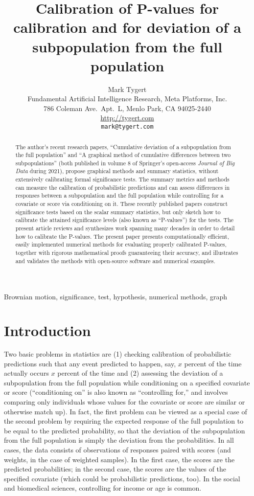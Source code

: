 \documentclass[12pt]{article}
\title{Calibration of P-values for calibration and for deviation
       of a subpopulation from the full population}
\author{Mark Tygert\\
        Fundamental Artificial Intelligence Research, Meta Platforms, Inc.\\
        786 Coleman Ave.\ Apt.\ L, Menlo Park, CA 94025-2440\\
        \url{http://tygert.com}\\
        {\tt mark@tygert.com}}
\begin{document}
\maketitle

\begin{abstract}
The author's recent research papers,
``Cumulative deviation of a subpopulation from the full population'' and
``A graphical method of cumulative differences between two subpopulations''
(both published in volume 8 of Springer's open-access {\it Journal of Big Data}
during 2021), propose graphical methods and summary statistics,
without extensively calibrating formal significance tests.
The summary metrics and methods can measure the calibration
of probabilistic predictions and can assess differences
in responses between a subpopulation and the full population while controlling
for a covariate or score via conditioning on it.
These recently published papers construct significance tests based
on the scalar summary statistics, but only sketch how to calibrate
the attained significance levels (also known as ``P-values'') for the tests.
The present article reviews and synthesizes work spanning many decades
in order to detail how to calibrate the P-values.
The present paper presents computationally efficient, easily implemented
numerical methods for evaluating properly calibrated P-values,
together with rigorous mathematical proofs guaranteeing their accuracy,
and illustrates and validates the methods with open-source software
and numerical examples.
\end{abstract}

 Brownian motion, significance, test, hypothesis,
                          numerical methods, graph



\section{Introduction}

Two basic problems in statistics are (1) checking calibration
of probabilistic predictions such that any event predicted
to happen, say, $x$ percent of the time actually occurs $x$ percent of the time
and (2) assessing the deviation of a subpopulation
from the full population while conditioning on a specified covariate or score
(``conditioning on'' is also known as ``controlling for,''
and involves comparing only individuals whose values for the covariate or score
are similar or otherwise match up).
In fact, the first problem can be viewed as a special case
of the second problem by requiring the expected response of the full population
to be equal to the predicted probability, so that the deviation
of the subpopulation from the full population is simply the deviation
from the probabilities. In all cases, the data consists of observations
of responses paired with scores (and weights, in the case of weighted samples).
In the first case, the scores are the predicted probabilities;
in the second case, the scores are the values of the specified covariate
(which could be probabilistic predictions, too).
In the social and biomedical sciences, controlling for income or age is common.
\end{document}
